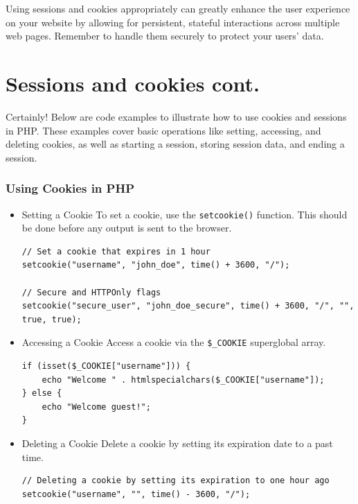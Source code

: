 \documentclass[11pt]{article}
\begin{document}
Using sessions and cookies appropriately can greatly enhance the user
experience on your website by allowing for persistent, stateful
interactions across multiple web pages. Remember to handle them securely
to protect your users' data.

\section{Sessions and cookies cont.}
\label{sec:org8f2d84c}
Certainly! Below are code examples to illustrate how to use cookies and
sessions in PHP. These examples cover basic operations like setting,
accessing, and deleting cookies, as well as starting a session, storing
session data, and ending a session.

\subsubsection{Using Cookies in PHP}
\label{sec:org0825c7a}
\begin{itemize}
\item Setting a Cookie
\label{sec:orgae862f4}
To set a cookie, use the \texttt{setcookie()} function. This should be done
before any output is sent to the browser.

\begin{verbatim}
// Set a cookie that expires in 1 hour
setcookie("username", "john_doe", time() + 3600, "/");

// Secure and HTTPOnly flags
setcookie("secure_user", "john_doe_secure", time() + 3600, "/", "", true, true);
\end{verbatim}

\item Accessing a Cookie
\label{sec:org0ff0dc2}
Access a cookie via the \texttt{\$\_COOKIE} superglobal array.

\begin{verbatim}
if (isset($_COOKIE["username"])) {
    echo "Welcome " . htmlspecialchars($_COOKIE["username"]);
} else {
    echo "Welcome guest!";
}
\end{verbatim}

\item Deleting a Cookie
\label{sec:orgec7c807}
Delete a cookie by setting its expiration date to a past time.

\begin{verbatim}
// Deleting a cookie by setting its expiration to one hour ago
setcookie("username", "", time() - 3600, "/");
\end{verbatim}
\end{itemize}
\end{document}
